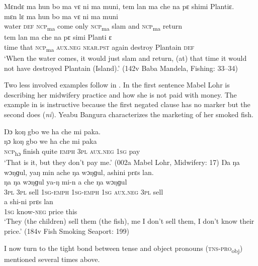 \ea%
    \label{ex:209}
    Mɛndɛ ma hun bo ma vɛ ni ma muni, tem lan ma che na pɛ shimi Plantiɛ.\\
    \gll mɛn    lɛ    ma    hun  bo    ma    vɛ    ni    ma    muni\\
    water    \textsc{def}  \textsc{ncp}\textsubscript{ma}    come  only  \textsc{ncp}\textsubscript{ma}    slam  and  \textsc{ncp}\textsubscript{ma}    return\\
    \gll tem  lan  ma    che      na        pɛ      simi    Planti    ɛ\\
    time  that  \textsc{ncp}\textsubscript{ma}    \textsc{aux.neg}    \textsc{near.pst}  again    destroy  Plantain  \textsc{def}\\
    \glt ‘When the water comes, it would just slam and return, (at) that time it would not have destroyed Plantain (Island).' (142v Baba Mandela, Fishing: 33--34)
\z


Two less involved examples follow in . In the first sentence Mabel Lohr is describing her midwifery practice and how she is not paid with money. The example in  is instructive because the first negated clause has no marker but the second does (\textit{ni}). Yeabu Bangura characterizes the marketing of her smoked fish.

\ea%
    \label{ex:210}
    \ea\label{ex:210a} Ŋɔ koŋ gbo we ha che mi paka.\\
    \gll ŋɔ      koŋ    gbo    we      ha    che      mi    paka\\
    \textsc{ncp}\textsubscript{hɔ}   finish    quite    \textsc{emph}    \textsc{3pl}  \textsc{aux.neg}    \textsc{1sg}  pay\\
    \glt ‘That is it, but they don't pay me.' (002a Mabel Lohr, Midwifery: 17)
    \ex\label{ex:210b} Ŋa ŋa wɔŋɡul, yaŋ min ache ŋa wɔŋɡul, ashini prɛs lan.\\
    \gll ŋa    ŋa    wɔŋɡul  ya-ŋ      mi-n      a    che      ŋa    wɔŋɡul\\
    \textsc{3pl}  \textsc{3pl}  sell    \textsc{1sg-emph}  \textsc{1sg-emph}  \textsc{1sg}  \textsc{aux.neg}    \textsc{3pl}  sell\\
    \gll a    shi-ni      prɛs  lan\\
    \textsc{1sg}  know-\textsc{neg}  price  this\\
    \glt ‘They (the children) sell them (the fish), me I don't sell them, I don't know their price.' (184v Fish Smoking Seaport: 199)
\z
\z

I now turn to the tight bond between tense and object pronouns (\textsc{tns-pro}\textsubscript{obj}) mentioned several times above.

